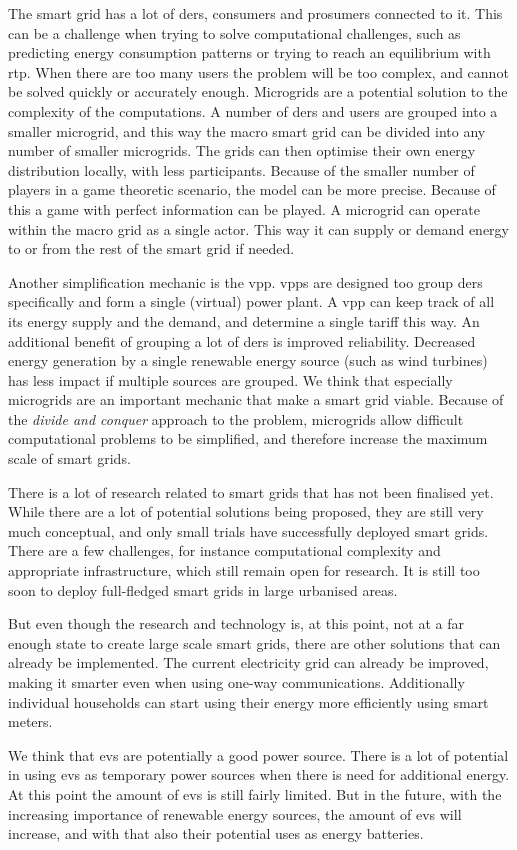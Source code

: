 The smart grid has a lot of \acp{der}, consumers and prosumers connected to it. This can be a challenge when trying to solve computational challenges, such as predicting energy consumption patterns or trying to reach an equilibrium with \ac{rtp}. When there are too many users the problem will be too complex, and cannot be solved quickly or accurately enough. 
Microgrids are a potential solution to the complexity of the computations. A number of \acp{der} and users are grouped into a smaller microgrid, and this way the macro smart grid can be divided into any number of smaller microgrids. The grids can then optimise their own energy distribution locally, with less participants. Because of the smaller number of players in a game theoretic scenario, the model can be more precise. Because of this a game with perfect information can be played.
A microgrid can operate within the macro grid as a single actor. This way it can supply or demand energy to or from the rest of the smart grid if needed.

Another simplification mechanic is the \ac{vpp}. \acp{vpp} are designed too group \acp{der} specifically and form a single (virtual) power plant. A \ac{vpp} can keep track of all its energy supply and the demand, and determine a single tariff this way. An additional benefit of grouping a lot of \acp{der} is improved reliability. Decreased energy generation by a single renewable energy source (such as wind turbines) has less impact if multiple sources are grouped.
We think that especially microgrids are an important mechanic that make a smart grid viable. Because of the \emph{divide and conquer} approach to the problem, microgrids allow difficult computational problems to be simplified, and therefore increase the maximum scale of smart grids.

There is a lot of research related to smart grids that has not been finalised yet. While there are a lot of potential solutions being proposed, they are still very much conceptual, and only small trials have successfully deployed smart grids. There are a few challenges, for instance computational complexity and appropriate infrastructure, which still remain open for research. It is still too soon to deploy full-fledged smart grids in large urbanised areas.

But even though the research and technology is, at this point, not at a far enough state to create large scale smart grids, there are other solutions that can already be implemented. The current electricity grid can already be improved, making it smarter even when using one-way communications. Additionally individual households can start using their energy more efficiently using smart meters. 

We think that \acp{ev} are potentially a good power source. There is a lot of potential in using \acp{ev} as temporary power sources when there is need for additional energy. At this point the amount of \acp{ev} is still fairly limited. But in the future, with the increasing importance of renewable energy sources, the amount of \acp{ev} will increase, and with that also their potential uses as energy batteries. 
